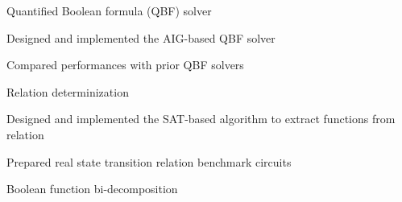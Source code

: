\begin{myexp}
    \item Quantified Boolean formula (QBF) solver 
        \begin{mybullet}
            \item Designed and implemented the AIG-based QBF solver
            \item Compared performances with prior QBF solvers
        \end{mybullet}
    \item Relation determinization
        \begin{mybullet}
            \item Designed and implemented the SAT-based algorithm to extract functions from relation
            \item Prepared real state transition relation benchmark circuits
        \end{mybullet}
    \item Boolean function bi-decomposition

\end{myexp}
